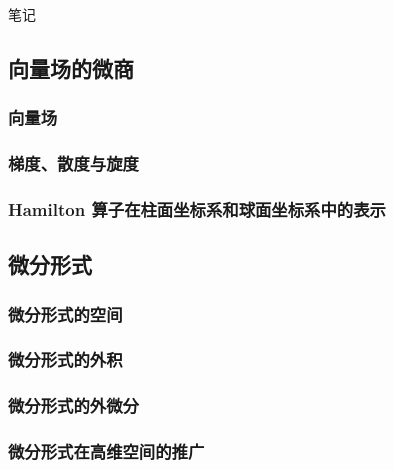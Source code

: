笔记

\subsection{向量场的微商}
\subsubsection{向量场}
\subsubsection{梯度、散度与旋度}
\subsubsection{Hamilton 算子在柱面坐标系和球面坐标系中的表示}

\subsection{微分形式}
\subsubsection{微分形式的空间}
\subsubsection{微分形式的外积}
\subsubsection{微分形式的外微分}
\subsubsection{微分形式在高维空间的推广}
